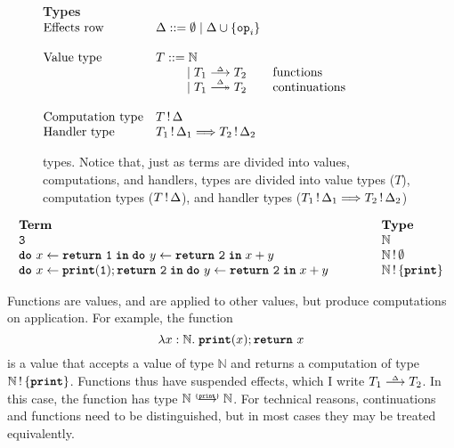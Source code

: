 \begin{figure}
  \begin{eff-desc}
  {\large \textbf{Types}}\\

  $\begin{array}{@{}lllr}
    \text{Effects row} & \Delta ::= \emptyset \mid \Delta \cup \{ \texttt{op}_i \} \\ \\
    \text{Value type} & T ::= \mathbb{N} & \\
                              &\quad\quad\,\,\, \mid \functionType{T_1}{T_2} & \text{functions}\\
                              &\quad\quad\,\,\, \mid \continuationType{T_1}{T_2} & \text{continuations}\\ \\
    \text{Computation type} & \effectType{T} \\
    \text{Handler type} & \handlerType{\effectType[\Delta_1]{T_1}}{\effectType[\Delta_2]{T_2}}
  \end{array}$
  \end{eff-desc}
  \caption{\efflang{} types. Notice that, just as terms are divided into values, computations, and handlers, types are divided into value types ($T$), computation types ($\effectType{T}$), and handler types ($\handlerType{\effectType[\Delta_1]{T_1}}{\effectType[\Delta_2]{T_2}}$)}
  \label{fig:efflang-type-syntax}
\end{figure}

\[
\begin{array}{lll}
  \textbf{Term} &\hspace{8mm}& \textbf{Type} \\
  \texttt{3} && \mathbb{N} \\ 
  \bind{x}{\return{\texttt{1}}}{\bind{y}{\return{\texttt{2}}}{x + y}} &&  \effectType[\emptyset]{\mathbb{N}} \\ 
  \bind{x}{\print{1}; \return{\texttt{2}}}{\bind{y}{\return{\texttt{2}}}{x + y}} &&  \effectType[\{ \texttt{\textbf{print}}\}]{\mathbb{N}} \\ 
\end{array}
\]

Functions are values, and are applied to other values, but produce computations on application. For example, the function 
\[
\function{x:\mathbb{N}}{\; \textbf{\texttt{print}}(x); \return{x}}
\]
is a value that accepts a value of type $\mathbb{N}$ and returns a computation of type $\effectType[\{\textbf{\texttt{print}} \}]{\mathbb{N}}$. Functions thus have suspended effects, which I write $\functionType{T_1}{T_2}$. In this case, the function has type $\functionType[\{ \textbf{\texttt{print}} \}]{\mathbb{N}}{\mathbb{N}}$. For technical reasons, continuations and functions need to be distinguished, but in most cases they may be treated equivalently. 

